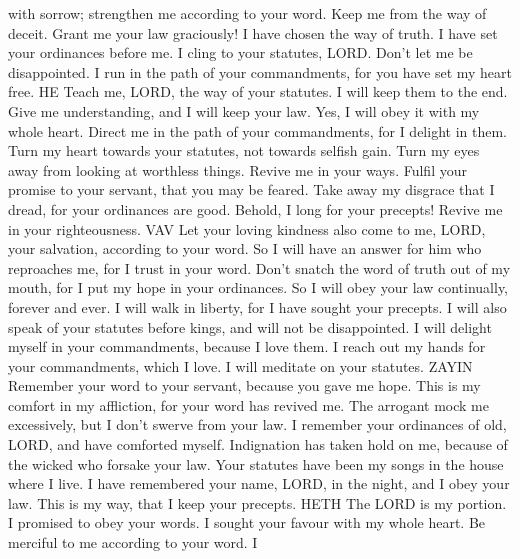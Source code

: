 with sorrow; strengthen me according to your word.  Keep
me from the way of deceit. Grant me your law graciously! 
I have chosen the way of truth. I have set your ordinances before me.
 I cling to your statutes, LORD. Don't let me be
disappointed.  I run in the path of your commandments,
for you have set my heart free. HE  Teach me, LORD, the
way of your statutes. I will keep them to the end.  Give
me understanding, and I will keep your law. Yes, I will obey it with my
whole heart.  Direct me in the path of your commandments,
for I delight in them.  Turn my heart towards your
statutes, not towards selfish gain.  Turn my eyes away
from looking at worthless things. Revive me in your ways.
 Fulfil your promise to your servant, that you may be
feared.  Take away my disgrace that I dread, for your
ordinances are good.  Behold, I long for your precepts!
Revive me in your righteousness. VAV  Let your loving
kindness also come to me, LORD, your salvation, according to your word.
 So I will have an answer for him who reproaches me, for
I trust in your word.  Don't snatch the word of truth out
of my mouth, for I put my hope in your ordinances.  So I
will obey your law continually, forever and ever.  I will
walk in liberty, for I have sought your precepts.  I will
also speak of your statutes before kings, and will not be disappointed.
 I will delight myself in your commandments, because I
love them.  I reach out my hands for your commandments,
which I love. I will meditate on your statutes. ZAYIN 
Remember your word to your servant, because you gave me hope.
 This is my comfort in my affliction, for your word has
revived me.  The arrogant mock me excessively, but I
don't swerve from your law.  I remember your ordinances
of old, LORD, and have comforted myself.  Indignation has
taken hold on me, because of the wicked who forsake your law.
 Your statutes have been my songs in the house where I
live.  I have remembered your name, LORD, in the night,
and I obey your law.  This is my way, that I keep your
precepts. HETH  The LORD is my portion. I promised to
obey your words.  I sought your favour with my whole
heart. Be merciful to me according to your word.  I
